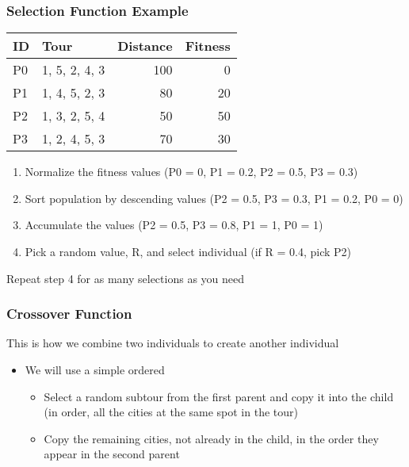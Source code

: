 \documentclass[aspectratio=169,10pt,compress]{beamer}
\begin{document}
\begin{frame}
  \frametitle{Selection Function Example}

  \begin{center}
    \begin{tabular}{llrr}
      \toprule
      ID & Tour & Distance & Fitness\\
      \midrule
      P0 & 1, 5, 2, 4, 3 & 100 &  0\\
      P1 & 1, 4, 5, 2, 3 &  80 & 20\\
      P2 & 1, 3, 2, 5, 4 &  50 & 50\\
      P3 & 1, 2, 4, 5, 3 &  70 & 30\\
      \bottomrule
    \end{tabular}
  \end{center}

  \begin{enumerate}
    \item Normalize the fitness values (P0 = 0, P1 = 0.2, P2 = 0.5, P3 = 0.3)
    \item Sort population by descending values (P2 = 0.5, P3 = 0.3, P1 = 0.2,
      P0 = 0)
    \item Accumulate the values (P2 = 0.5, P3 = 0.8, P1 = 1, P0 = 1)
    \item Pick a random value, R, and select individual (if R = 0.4, pick P2)
  \end{enumerate}

  Repeat step 4 for as many selections as you need
\end{frame}

\begin{frame}
  \frametitle{Crossover Function}

  This is how we combine two individuals to create another individual

  \begin{itemize}
    \item We will use a simple ordered 
      \begin{itemize}
        \item Select a random subtour from the first parent and copy it into the
          child (in order, all the cities at the same spot in the tour)
        \item Copy the remaining cities, not already in the child, in the order
          they appear in the second parent
      \end{itemize}
  \end{itemize}

\end{frame}
\end{document}
